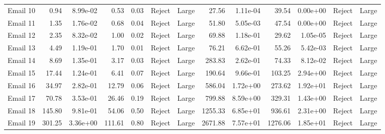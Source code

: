 \begin{tabular}{lrrrrllrrrrll}
 Email 10 &               0.94 &  8.99e-02 &                0.53 &  0.03 &   Reject &       Large &                    27.56 &  1.11e-04 &                     39.54 &  0.00e+00 &  Reject &       Large \\
 Email 11 &               1.35 &  1.76e-02 &                0.68 &  0.04 &   Reject &       Large &                    51.80 &  5.05e-03 &                     47.54 &  0.00e+00 &  Reject &       Large \\
 Email 12 &               2.35 &  8.32e-02 &                1.00 &  0.02 &   Reject &       Large &                    69.88 &  1.18e-01 &                     29.62 &  1.05e-05 &  Reject &       Large \\
 Email 13 &               4.49 &  1.19e-01 &                1.70 &  0.01 &   Reject &       Large &                    76.21 &  6.62e-01 &                     55.26 &  5.42e-03 &  Reject &       Large \\
 Email 14 &               8.69 &  1.35e-01 &                3.17 &  0.03 &   Reject &       Large &                   283.83 &  2.62e-01 &                     74.33 &  8.12e-02 &  Reject &       Large \\
 Email 15 &              17.44 &  1.24e-01 &                6.41 &  0.07 &   Reject &       Large &                   190.64 &  9.66e-01 &                    103.25 &  2.94e+00 &  Reject &       Large \\
 Email 16 &              34.97 &  2.82e-01 &               12.79 &  0.06 &   Reject &       Large &                   586.04 &  1.72e+00 &                    273.62 &  1.92e+01 &  Reject &       Large \\
 Email 17 &              70.78 &  3.53e-01 &               26.46 &  0.19 &   Reject &       Large &                   799.88 &  8.59e+00 &                    329.31 &  1.43e+00 &  Reject &       Large \\
 Email 18 &             145.80 &  9.81e-01 &               54.06 &  0.50 &   Reject &       Large &                  1255.33 &  6.85e+01 &                    936.61 &  2.31e+00 &  Reject &       Large \\
 Email 19 &             301.25 &  3.36e+00 &              111.61 &  0.80 &   Reject &       Large &                  2671.88 &  7.57e+01 &                   1276.06 &  1.85e+01 &  Reject &       Large \\
\bottomrule
\end{tabular}
